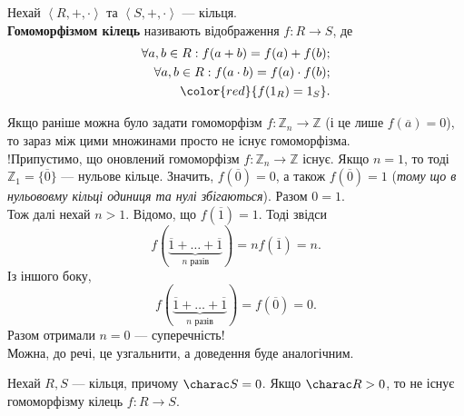 \documentclass{math_library}
\begin{document}
\begin{definition*}
Нехай $\left<R, +, \cdot \right>$ та $\left<S, +, \cdot \right>$ --- кільця.\\
\textbf{Гомоморфізмом кілець} називають відображення $f \colon R \to S$, де
\begin{align*}
\forall a,b \in R: f(a+b) = f(a) + f(b); \\
\forall a,b \in R: f(a \cdot b) = f(a) \cdot f(b); \\
\color{red}{f(1_R) = 1_S}.
\end{align*}
\end{definition*}

\begin{example*}
Якщо раніше можна було задати гомоморфізм $f \colon \mathbb{Z}_n \to \mathbb{Z}$ (і це лише $f(\overline{a}) = 0$), то зараз між цими множинами просто не існує гомоморфізма.
\bigskip \\
!Припустимо, що оновлений гомоморфізм $f \colon \mathbb{Z}_n \to \mathbb{Z}$ існує. Якщо $n = 1$, то тоді $\mathbb{Z}_1 = \{ \overline{0} \}$ --- нульове кільце. Значить, $f(\overline{0}) = 0$, а також $f(\overline{0}) = 1$ (\textit{тому що в нульововму кільці одиниця та нулі збігаються}). Разом $0 = 1$.\\
Тож далі нехай $n > 1$. Відомо, що $f(\overline{1}) = 1$. Тоді звідси
\[
f(\underbrace{\overline{1} + \dots + \overline{1}}_{n \text{ разів}}) = n f(\overline{1}) = n.
\]
Із іншого боку,
\[
f(\underbrace{\overline{1} + \dots + \overline{1}}_{n \text{ разів}}) = f(\overline{0}) = 0.
\]
Разом отримали $n = 0$ --- суперечність!
\bigskip \\
Можна, до речі, це узгальнити, а доведення буде аналогічним.
\end{example*}

\begin{proposition*}
Нехай $R,S$ --- кільця, причому $\charac S = 0$. Якщо $\charac R > 0$, то не існує гомоморфізму кілець $f \colon R \to S$.
\end{proposition*}
\end{document}
